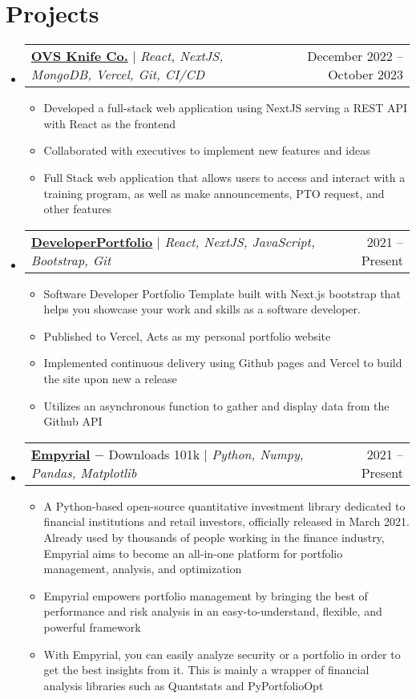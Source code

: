 \documentclass[letterpaper,11pt]{article}
\makeatletter
\newcommand{\resumeItem}[1]{
  \item\small{
    {#1 \vspace{-2pt}}
  }
}
\newcommand{\resumeProjectHeading}[2]{
    \item
    \begin{tabular*}{0.97\textwidth}{l@{\extracolsep{\fill}}r}
      \small#1 & #2 \\
    \end{tabular*}\vspace{-5pt}
}
\newcommand{\resumeSubHeadingListStart}{\begin{itemize}[leftmargin=0.15in, label={}]}
\newcommand{\resumeSubHeadingListEnd}{\end{itemize}}
\newcommand{\resumeItemListStart}{\begin{itemize}}
\newcommand{\resumeItemListEnd}{\end{itemize}\vspace{-4pt}}
\makeatother
\begin{document}
\section{Projects}
    \resumeSubHeadingListStart
      \resumeProjectHeading
          {\textbf{\href{https://ovsknife.com/home}{OVS Knife Co.}} $|$ \emph{React, NextJS, MongoDB, Vercel, Git, CI/CD}}{December 2022 -- October 2023}
          \resumeItemListStart
            \resumeItem{Developed a full-stack web application using NextJS serving a REST API with React as the frontend}
            \resumeItem{Collaborated with executives to implement new features and ideas}
            \resumeItem{Full Stack web application that allows users to access and interact with a training program, as well as make announcements, PTO request, and other features}
          \resumeItemListEnd
      \resumeProjectHeading
          {\textbf{\href{https://dev-port-lac.vercel.app/}{DeveloperPortfolio}} $|$ \emph{React, NextJS, JavaScript, Bootstrap, Git}}{2021 -- Present}
          \resumeItemListStart
            \resumeItem{Software Developer Portfolio Template built with Next.js bootstrap that helps you showcase your work and skills as a software developer.}
            \resumeItem{Published to Vercel, Acts as my personal portfolio website}
            \resumeItem{Implemented continuous delivery using Github pages and Vercel to build the site upon new a release}
            \resumeItem{Utilizes an asynchronous function to gather and display data from the Github API}
          \resumeItemListEnd
      \resumeProjectHeading
          {\textbf{\href{https://github.com/ssantoshp/Empyrial}{Empyrial}} $-$ \emph{}{Downloads 101k} $|$ \emph{Python, Numpy, Pandas, Matplotlib}}{2021 -- Present}
          \resumeItemListStart
            \resumeItem{A Python-based open-source quantitative investment library dedicated to financial institutions and retail investors, officially released in March 2021. Already used by thousands of people working in the finance industry, Empyrial aims to become an all-in-one platform for portfolio management, analysis, and optimization}
            \resumeItem{Empyrial empowers portfolio management by bringing the best of performance and risk analysis in an easy-to-understand, flexible, and powerful framework}
            \resumeItem{With Empyrial, you can easily analyze security or a portfolio in order to get the best insights from it. This is mainly a wrapper of financial analysis libraries such as Quantstats and PyPortfolioOpt}
          \resumeItemListEnd
    \resumeSubHeadingListEnd
\end{document}
